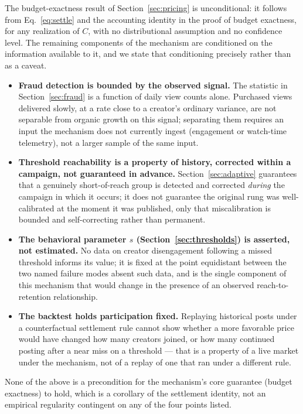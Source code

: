 \documentclass[11pt]{article}
\begin{document}
The budget-exactness result of Section~\ref{sec:pricing} is unconditional: it follows from
Eq.~\eqref{eq:settle} and the accounting identity in the proof of budget exactness, for any
realization of $C$, with no distributional assumption and no confidence level. The remaining
components of the mechanism are conditioned on the information available to it, and we state that
conditioning precisely rather than as a caveat.

\begin{itemize}[leftmargin=1.6em]
\item \textbf{Fraud detection is bounded by the observed signal.} The statistic in
Section~\ref{sec:fraud} is a function of daily view counts alone. Purchased views delivered slowly,
at a rate close to a creator's ordinary variance, are not separable from organic growth on this
signal; separating them requires an input the mechanism does not currently ingest (engagement or
watch-time telemetry), not a larger sample of the same input.
\item \textbf{Threshold reachability is a property of history, corrected within a campaign, not
guaranteed in advance.} Section~\ref{sec:adaptive} guarantees that a genuinely short-of-reach group
is detected and corrected \emph{during} the campaign in which it occurs; it does not guarantee the
original rung was well-calibrated at the moment it was published, only that miscalibration is
bounded and self-correcting rather than permanent.
\item \textbf{The behavioral parameter $s$ (Section~\ref{sec:thresholds}) is asserted, not
estimated.} No data on creator disengagement following a missed threshold informs its value; it is
fixed at the point equidistant between the two named failure modes absent such data, and is the
single component of this mechanism that would change in the presence of an observed
reach-to-retention relationship.
\item \textbf{The backtest holds participation fixed.} Replaying historical posts under a
counterfactual settlement rule cannot show whether a more favorable price would have changed how
many creators joined, or how many continued posting after a near miss on a threshold — that is a
property of a live market under the mechanism, not of a replay of one that ran under a different
rule.
\end{itemize}

None of the above is a precondition for the mechanism's core guarantee (budget exactness) to hold,
which is a corollary of the settlement identity, not an empirical regularity contingent on any of
the four points listed.
\end{document}
